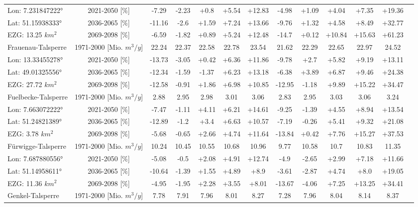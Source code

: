 \begin{longtable}{@{\extracolsep{\fill}}lc|ccccc||cccccc}
\cline{2-13} 
Lon: 7.231847222° & 2021-2050 [\%]  & -7.29 & -2.23 & +0.8 & +5.54 & +12.83 & -4.98 & +1.09 & +4.04 & +7.35 & +19.36 & \\ 
Lat: 51.15938333° & 2036-2065 [\%]  & -11.16 & -2.6 & +1.59 & +7.24 & +13.66 & -9.76 & +1.32 & +4.58 & +8.49 & +32.77 & \\ 
EZG: 13.25 $km^2$ & 2069-2098 [\%]  & -6.59 & -1.82 & +0.89 & +5.24 & +12.48 & -14.7 & +0.12 & +10.84 & +15.63 & +61.23 & \\ 
\hline 
Frauenau-Talsperre & 1971-2000 [Mio. $m^3/y$]  & 22.24 & 22.37 & 22.58 & 22.78 & 23.54 & 21.62 & 22.29 & 22.65 & 22.97 & 24.52 & \\ 
\cline{2-13} 
Lon: 13.33455278° & 2021-2050 [\%]  & -13.73 & -3.05 & +0.42 & +6.36 & +11.86 & -9.78 & +2.7 & +5.82 & +9.19 & +13.11 & \\ 
Lat: 49.01325556° & 2036-2065 [\%]  & -12.34 & -1.59 & -1.37 & +6.23 & +13.18 & -6.38 & +3.89 & +6.87 & +9.46 & +24.38 & \\ 
EZG: 27.72 $km^2$ & 2069-2098 [\%]  & -12.58 & -0.91 & +1.86 & +6.98 & +10.85 & -12.95 & -1.18 & +9.89 & +15.22 & +34.47 & \\ 
\hline 
Fuelbecke-Talsperre & 1971-2000 [Mio. $m^3/y$]  & 2.88 & 2.95 & 2.98 & 3.01 & 3.06 & 2.83 & 2.95 & 3.03 & 3.06 & 3.24 & \\ 
\cline{2-13} 
Lon: 7.663072222° & 2021-2050 [\%]  & -7.47 & -1.11 & +4.11 & +6.21 & +14.61 & -9.25 & -1.39 & +4.55 & +8.94 & +13.54 & \\ 
Lat: 51.24821389° & 2036-2065 [\%]  & -12.89 & -1.2 & +3.4 & +6.63 & +10.57 & -7.19 & -0.26 & +5.41 & +9.32 & +21.08 & \\ 
EZG: 3.78 $km^2$ & 2069-2098 [\%]  & -5.68 & -0.65 & +2.66 & +4.74 & +11.64 & -13.84 & +0.42 & +7.76 & +15.27 & +37.53 & \\ 
\hline 
Fürwigge-Talsperre & 1971-2000 [Mio. $m^3/y$]  & 10.24 & 10.45 & 10.55 & 10.68 & 10.96 & 9.77 & 10.58 & 10.7 & 10.83 & 11.35 & \\ 
\cline{2-13} 
Lon: 7.687880556° & 2021-2050 [\%]  & -5.08 & -0.5 & +2.08 & +4.91 & +12.74 & -4.9 & -2.65 & +2.99 & +7.18 & +11.66 & \\ 
Lat: 51.14958611° & 2036-2065 [\%]  & -10.64 & -1.39 & +1.55 & +4.89 & +8.9 & -3.61 & -2.87 & +4.74 & +8.0 & +19.05 & \\ 
EZG: 11.36 $km^2$ & 2069-2098 [\%]  & -4.95 & -1.95 & +2.28 & +3.55 & +8.01 & -13.67 & -4.06 & +7.25 & +13.25 & +34.41 & \\ 
\hline 
Genkel-Talsperre & 1971-2000 [Mio. $m^3/y$]  & 7.78 & 7.91 & 7.96 & 8.01 & 8.27 & 7.28 & 7.96 & 8.04 & 8.14 & 8.37 & \\ 

\end{longtable}
